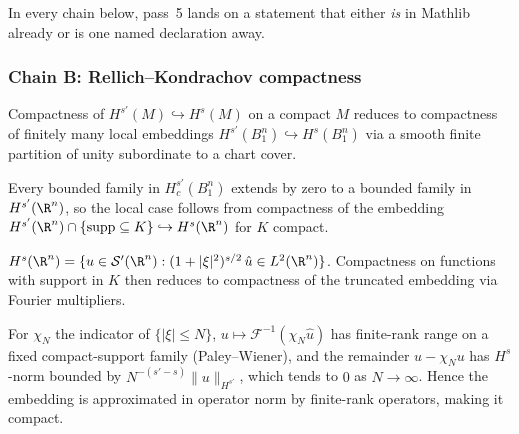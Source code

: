 In every chain below, pass~5 lands on a statement that either
\emph{is} in Mathlib already or is one named declaration away.

\subsubsection*{Chain B: Rellich--Kondrachov compactness}

\begin{lemma}
\label{lem:rk-r1-partition-localize}
Compactness of $H^{s'}(M) \hookrightarrow H^{s}(M)$ on a compact
$M$ reduces to compactness of finitely many local embeddings
$H^{s'}(B^{n}_{1}) \hookrightarrow H^{s}(B^{n}_{1})$ via a smooth
finite partition of unity subordinate to a chart cover.
\leanok
\end{lemma}

\begin{lemma}
\label{lem:rk-r2-local-flat}
Every bounded family in $H^{s'}_{c}(B^{n}_{1})$ extends by
zero to a bounded family in $H^{s'}(\R^{n})$, so the local case
follows from compactness of the embedding $H^{s'}(\R^{n})
\cap \{\mathrm{supp} \subseteq K\} \hookrightarrow H^{s}(\R^{n})$
for $K$ compact.
\leanok
\end{lemma}

\begin{lemma}
\label{lem:rk-r3-fourier-characterization}
$H^{s}(\R^{n}) = \{ u \in \mathcal{S}'(\R^{n}) :
(1+|\xi|^{2})^{s/2}\,\hat u \in L^{2}(\R^{n})\}$.  Compactness
on functions with support in $K$ then reduces to compactness of
the truncated embedding via Fourier multipliers.
\leanok
\end{lemma}

\begin{lemma}
\label{lem:rk-r4-truncation-compact}
For $\chi_{N}$ the indicator of $\{|\xi| \leq N\}$,
$u \mapsto \mathcal{F}^{-1}(\chi_{N} \hat u)$ has finite-rank
range on a fixed compact-support family (Paley--Wiener), and the
remainder $u - \chi_{N} u$ has $H^{s}$-norm bounded by
$N^{-(s'-s)} \|u\|_{H^{s'}}$, which tends to $0$ as $N \to
\infty$.  Hence the embedding is approximated in operator norm
by finite-rank operators, making it compact.
\leanok
\end{lemma}

